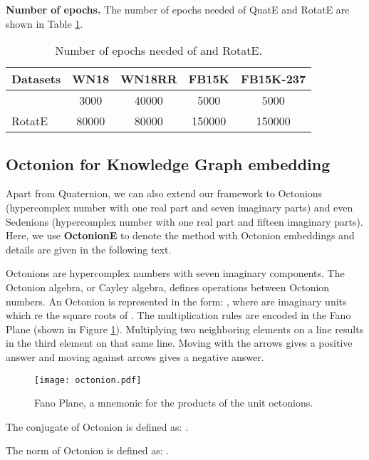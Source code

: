 \documentclass{article}
\begin{document}
\textbf{Number of epochs.} The number of epochs needed of QuatE and RotatE are shown in Table \ref{ref:table2}.

\begin{table}[h]
\centering
\caption{Number of epochs needed of  and RotatE.}
\begin{tabular}{|l|c|c|c|c|}
\hline
Datasets & WN18  & WN18RR & FB15K  & FB15K-237 \\ \hline
    & 3000  & 40000  & 5000   & 5000     \\ \hline
RotatE   & 80000 & 80000  & 150000 & 150000    \\ \hline
\end{tabular}
\label{ref:table2}
\end{table}







\subsection{Octonion for Knowledge Graph embedding}
Apart from Quaternion, we can also extend our framework to Octonions (hypercomplex number with one real part and seven imaginary parts) and even Sedenions (hypercomplex number with one real part and fifteen imaginary parts). Here, we use \textbf{OctonionE} to denote the method with Octonion embeddings and details are given in the following text.

Octonions are hypercomplex numbers with seven imaginary components. The Octonion algebra, or Cayley algebra,  defines operations between Octonion numbers. An Octonion is represented in the form: , where  are imaginary units which re the square roots of . The multiplication rules are encoded in the Fano Plane (shown in Figure \ref{fig:octonion}). Multiplying two neighboring elements on a line results in the third element on that same line. Moving with the arrows gives a positive answer and moving against arrows gives a negative answer.

\begin{figure}[t]
\centering
\texttt{[image: octonion.pdf]}
\caption{Fano Plane, a mnemonic for the products of the unit octonions.}
\label{fig:octonion}
\vspace{-1.em}
\end{figure}

The conjugate of Octonion is defined as: .

The norm of Octonion is defined as: .
\end{document}
